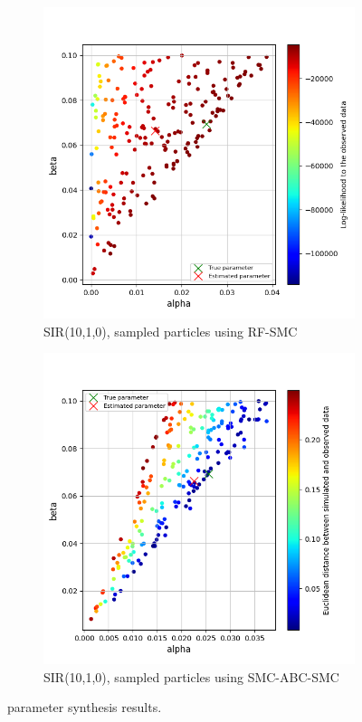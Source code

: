 \begin{figure}[H]
    \centering
    \begin{subfigure}{0.48\textwidth}
        \centering
        \includegraphics[width=\linewidth]{figures/sir1010_rfsmc.png}
        \caption{SIR(10,1,0), sampled particles using RF-SMC}
    \end{subfigure}
    \hfill
    \begin{subfigure}{0.48\textwidth}
        \centering
        \includegraphics[width=\linewidth]{figures/sir1010_abcsmc.png}
        \caption{SIR(10,1,0), sampled particles using SMC-ABC-SMC}
    \end{subfigure}
    \caption{ parameter synthesis results.}
\end{figure}

